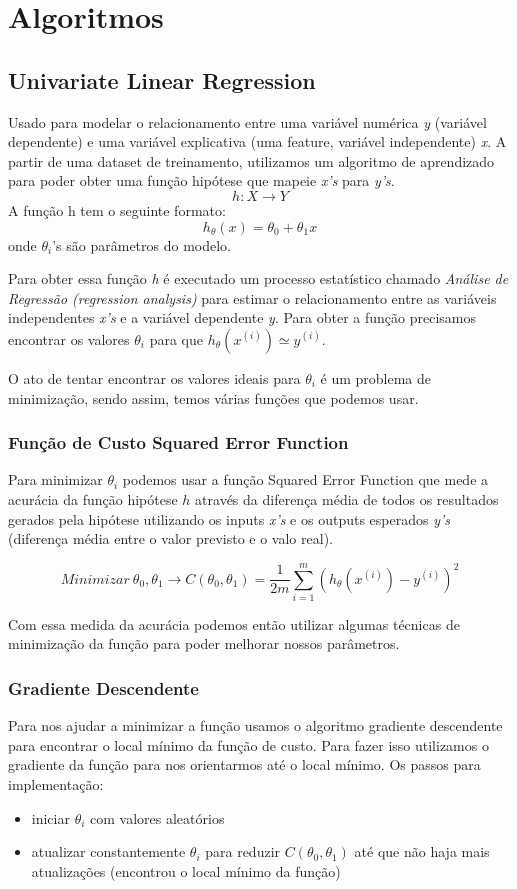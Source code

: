 \documentclass[11pt,a4paper,leqno]{article}
\begin{document}
\newpage
\section{Algoritmos}

\subsection{Univariate Linear Regression}
Usado para modelar o relacionamento entre uma variável numérica \emph{y} (variável dependente) e uma variável explicativa (uma feature, variável independente) \emph{x}.
A partir de uma dataset de treinamento, utilizamos um algoritmo de aprendizado para poder obter uma função hipótese que mapeie \emph{x's} para \emph{y's}.
\[h:X \rightarrow Y\]
A função h tem o seguinte formato:
\[ h_\theta(x) = \theta_0 + \theta_1 x \]
onde $\theta_i$'s são parâmetros do modelo.

Para obter essa função \emph{h} é executado um processo estatístico chamado \emph{Análise de Regressão (regression analysis)} para estimar o relacionamento entre as variáveis independentes \emph{x's} e a variável dependente \emph{y}.
Para obter a função precisamos encontrar os valores $\theta_i$ para que $h_\theta (x^{(i)}) \simeq y^{(i)}$.

O ato de tentar encontrar os valores ideais para $\theta_i$ é um problema de minimização, sendo assim, temos várias funções que podemos usar.


\subsubsection{Função de Custo Squared Error Function}
Para minimizar $\theta_i$ podemos usar a função Squared Error Function que mede a acurácia da função hipótese $h$ através da diferença média de todos os resultados gerados pela hipótese utilizando os inputs \emph{x's} e os outputs esperados \emph{y's} (diferença média entre o valor previsto e o valo real).

\[
Minimizar \ \theta_0, \theta_1 \rightarrow C (\theta_0, \theta_1) = \frac{1}{2m} \sum_{i=1}^m ( h_\theta (x^{(i)}) - y^{(i)}) ^ 2
\]

Com essa medida da acurácia podemos então utilizar algumas técnicas de minimização da função para poder melhorar nossos parâmetros.

\subsubsection{Gradiente Descendente}
Para nos ajudar a minimizar a função usamos o algoritmo gradiente descendente para encontrar o local mínimo da função de custo.
Para fazer isso utilizamos o gradiente da função para nos orientarmos até o local mínimo.
Os passos para implementação:
\begin{itemize}
\item iniciar $\theta_i$ com valores aleatórios
\item atualizar constantemente $\theta_i$ para reduzir $C(\theta_0, \theta_1)$ até que não haja mais atualizações (encontrou o local mínimo da função)
\end{itemize}
\end{document}
